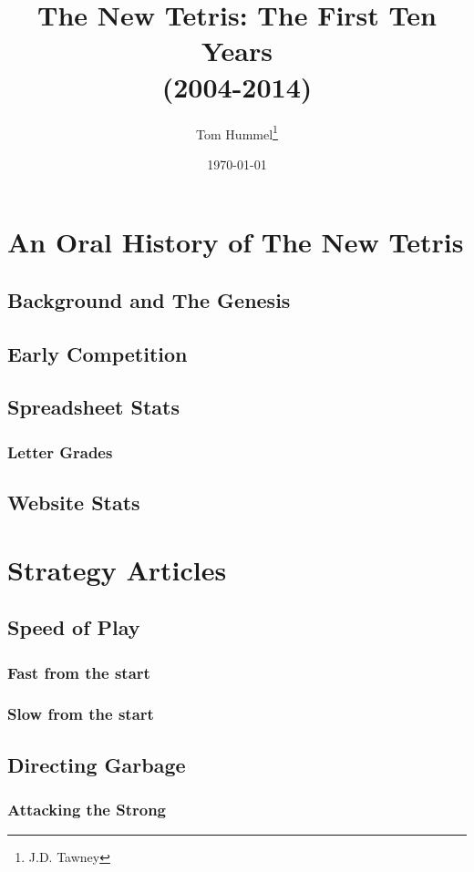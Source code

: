 \documentclass[a4paper,twoside,titlepage]{book}
\title{The New Tetris: The First Ten Years 
\\(2004-2014)}
\author{Tom Hummel\thanks{J.D. Tawney}}
\date{\today}
\begin{document}
  \maketitle
  \tableofcontents \newpage
  
  
  
  \part{An Oral History of The New Tetris}
    \chapter{Background and The Genesis}
    \chapter{Early Competition}
    \chapter{Spreadsheet Stats}
      \section{Letter Grades}
    \chapter{Website Stats}
  \part{Strategy Articles}
    \chapter{Speed of Play}
      \section{Fast from the start}
      \section{Slow from the start}
    \chapter{Directing Garbage}
      \section{Attacking the Strong}
\end{document}
